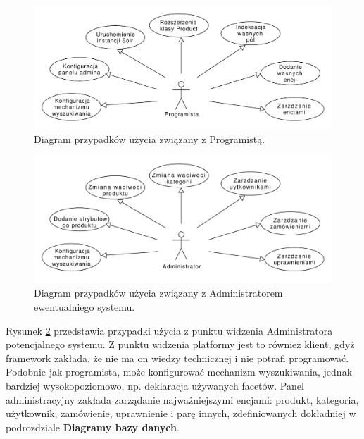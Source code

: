 \begin{figure}
\begin{center}
	\includegraphics[width=1\textwidth]{ucdev.pdf}
\end{center}
\caption{{\color{black}Diagram przypadków użycia związany z Programistą.}} \label{useCaseProgrammer}
\end{figure}
\begin{figure}
	\begin{center}
		\includegraphics[width=1\textwidth]{ucadmin.pdf}
	\end{center}
	\caption{{\color{black}Diagram przypadków użycia związany z Administratorem ewentualniego systemu.}} \label{useCaseAdmin}
\end{figure}
Rysunek \ref{useCaseAdmin} przedstawia przypadki użycia z punktu widzenia Administratora potencjalnego systemu. Z punktu widzenia platformy jest to również klient, gdyż framework zakłada, że nie ma on wiedzy technicznej i nie potrafi programować. Podobnie jak programista, może konfigurować mechanizm wyszukiwania, jednak bardziej wysokopoziomowo, np. deklaracja używanych facetów. Panel administracyjny zakłada zarządanie najważniejszymi encjami: produkt, kategoria, użytkownik, zamówienie, uprawnienie i parę innych, zdefiniowanych dokładniej w podrozdziale \textbf{Diagramy bazy danych}.

